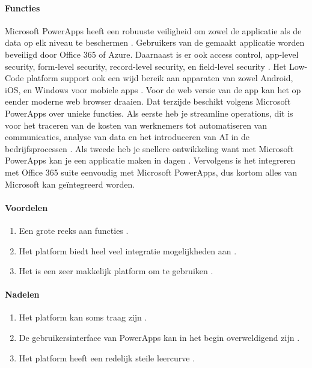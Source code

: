 \paragraph{Functies}
Microsoft PowerApps heeft een robuuste veiligheid om zowel de applicatie als de data op elk niveau te beschermen \autocite{Nguyen}.
Gebruikers van de gemaakt applicatie worden beveiligd door Office 365 of Azure. Daarnaast is er ook access control, app-level security, form-level security, record-level security, en field-level security  \autocite{Nguyen}.
Het Low-Code platform support ook een wijd bereik aan apparaten van zowel Android, iOS, en Windows voor mobiele apps \autocite{Nguyen}.
Voor de web versie van de app kan het op eender moderne web browser draaien. Dat terzijde beschikt volgens \textcite{Gupta2023} Microsoft PowerApps over unieke functies. Als eerste heb je 
streamline operations, dit is voor het traceren van de kosten van werknemers tot automatiseren van communicaties, analyse van data en het introduceren van AI in de bedrijfsprocessen \autocite{Gupta2023}.
Als tweede heb je snellere ontwikkeling want met Microsoft PowerApps kan je een applicatie maken in dagen \autocite{Gupta2023}. Vervolgens is het integreren met Office 365 suite eenvoudig met Microsoft PowerApps,
 dus kortom alles van Microsoft kan geïntegreerd worden.

 \paragraph*{Voordelen}
\begin{enumerate}
    \item Een grote reeks aan functies \autocite{Marvin2018}.
    \item Het platform biedt heel veel integratie mogelijkheden aan \autocite{Marvin2018}.
    \item Het is een zeer makkelijk platform om te gebruiken \autocite{Marvin2018}.
\end{enumerate}


\paragraph*{Nadelen}
\begin{enumerate}
    \item Het platform kan soms traag zijn \autocite{Marvin2018}.
    \item De gebruikersinterface van PowerApps kan in het begin overweldigend zijn \autocite{Marvin2018}.
    \item Het platform heeft een redelijk steile leercurve \autocite{Marvin2018}.
\end{enumerate}

